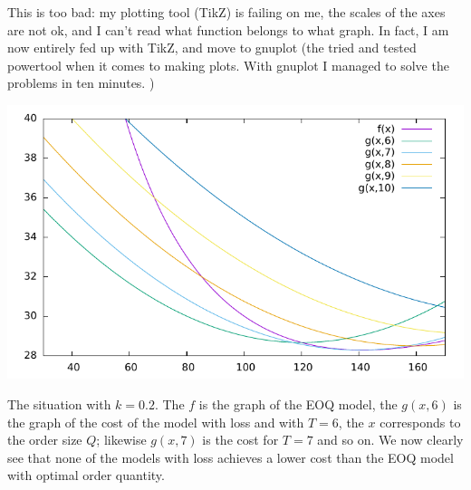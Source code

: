 \begin{question}
\begin{solution}
\begin{center}
\end{center}

This is too bad: my plotting tool (TikZ) is failing on me, the scales
of the axes are not ok, and I can't read what function belongs to what
graph. In fact, I am now entirely fed up with TikZ, and move to
gnuplot (the tried and tested powertool when it comes to making
plots. With gnuplot I managed to solve the problems in ten minutes. )

\begin{center}
  \includegraphics{figures/eoq_loss_0_2}
\end{center}

The situation with $k=0.2$. The $f$ is the graph of the EOQ model, the
$g(x,6)$ is the graph of the cost of the model with loss and with
$T=6$, the $x$ corresponds to the order size $Q$; likewise $g(x,7)$ is
the cost for $T=7$ and so on. We now clearly see that none of the
models with loss achieves a lower cost than the EOQ model with optimal order quantity. 


\end{solution}
\end{question}
